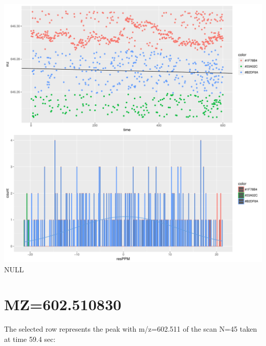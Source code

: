 \documentclass[]{article}
\newenvironment{Shaded}{\begin{snugshade}}{\end{snugshade}}
\newcommand{\KeywordTok}[1]{\textcolor[rgb]{0.13,0.29,0.53}{\textbf{#1}}}
\newcommand{\FloatTok}[1]{\textcolor[rgb]{0.00,0.00,0.81}{#1}}
\newcommand{\OperatorTok}[1]{\textcolor[rgb]{0.81,0.36,0.00}{\textbf{#1}}}
\newcommand{\NormalTok}[1]{#1}
\begin{document}
\includegraphics{Supplementary_document_files/figure-latex/filter.lm.646-1.pdf}
NULL

\section{MZ=602.510830}\label{mz602.510830}

\begin{Shaded}
\end{Shaded}

The selected row represents the peak with m/z=602.511 of the scan N=45
taken at time 59.4 sec:

\begin{Shaded}
\end{Shaded}
\end{document}
